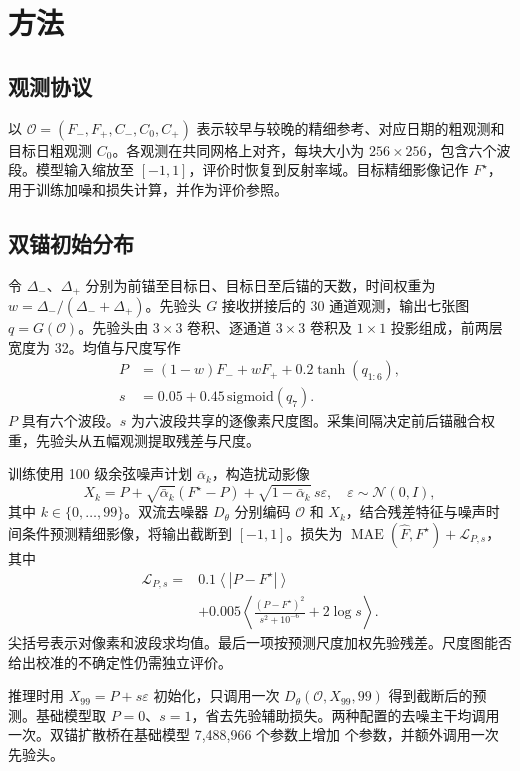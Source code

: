 \documentclass{article}
\newcommand{\obs}{\mathcal{O}}
\newcommand{\target}{F^\star}
\begin{document}
\section{方法}
\subsection{观测协议}
以 $\obs=(F_-,F_+,C_-,C_0,C_+)$ 表示较早与较晚的精细参考、对应日期的粗观测和目标日粗观测 $C_0$。各观测在共同网格上对齐，每块大小为 $256\times256$，包含六个波段。模型输入缩放至 $[-1,1]$，评价时恢复到反射率域。目标精细影像记作 $\target$，用于训练加噪和损失计算，并作为评价参照。

\subsection{双锚初始分布}
令 $\Delta_-$、$\Delta_+$ 分别为前锚至目标日、目标日至后锚的天数，时间权重为 $w=\Delta_-/(\Delta_-+\Delta_+)$。先验头 $G$ 接收拼接后的 30 通道观测，输出七张图 $q=G(\obs)$。先验头由 $3\times3$ 卷积、逐通道 $3\times3$ 卷积及 $1\times1$ 投影组成，前两层宽度为 32。均值与尺度写作
\begin{align}
P&=(1-w)F_-+wF_++0.2\tanh(q_{1:6}),\\
s&=0.05+0.45\,\mathrm{sigmoid}(q_7).
\end{align}
$P$ 具有六个波段。$s$ 为六波段共享的逐像素尺度图。采集间隔决定前后锚融合权重，先验头从五幅观测提取残差与尺度。

训练使用 100 级余弦噪声计划 $\bar\alpha_k$，构造扰动影像
\begin{equation}
X_k=P+\sqrt{\bar\alpha_k}(\target-P)
       +\sqrt{1-\bar\alpha_k}\,s\varepsilon,\quad
\varepsilon\sim\mathcal{N}(0,I),
\label{eq:bridge}
\end{equation}
其中 $k\in\{0,\ldots,99\}$。双流去噪器 $D_\theta$ 分别编码 $\obs$ 和 $X_k$，结合残差特征与噪声时间条件预测精细影像，将输出截断到 $[-1,1]$。损失为 $\operatorname{MAE}(\widehat{F},\target)+\mathcal{L}_{P,s}$，其中
\begin{align}
\mathcal{L}_{P,s}={}&0.1\left\langle |P-\target|\right\rangle\\
&+0.005\left\langle
\frac{(P-\target)^2}{s^2+10^{-6}}+2\log s\right\rangle .
\end{align}
尖括号表示对像素和波段求均值。最后一项按预测尺度加权先验残差。尺度图能否给出校准的不确定性仍需独立评价。

推理时用 $X_{99}=P+s\varepsilon$ 初始化，只调用一次 $D_\theta(\obs,X_{99},99)$ 得到截断后的预测。基础模型取 $P=0$、$s=1$，省去先验辅助损失。两种配置的去噪主干均调用一次。双锚扩散桥在基础模型 7,488,966 个参数上增加 \BridgeExtraParams{} 个参数，并额外调用一次先验头。
\end{document}
